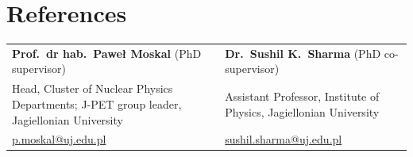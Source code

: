 \documentclass[10.5pt,a4paper]{article}
\begin{document}
\section{References}
\begin{tabularx}{\textwidth}{@{}X X@{}}
\textbf{Prof.\ dr hab.\ Pawe{\l} Moskal} (PhD supervisor) & \textbf{Dr.\ Sushil K.\ Sharma} (PhD co-supervisor)\\
Head, Cluster of Nuclear Physics Departments; J-PET group leader, Jagiellonian University & Assistant Professor, Institute of Physics, Jagiellonian University\\
\href{mailto:p.moskal@uj.edu.pl}{p.moskal@uj.edu.pl} & \href{mailto:sushil.sharma@uj.edu.pl}{sushil.sharma@uj.edu.pl}\\
\end{tabularx}
\end{document}
